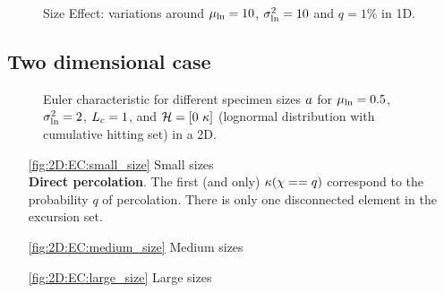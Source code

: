 \documentclass[12pt]{article}
\begin{document}
\begin{figure}[!h]
  \centering
    \hspace*{\fill}
  \hfill
   \hfill
  \hspace*{\fill}
  \caption{Size Effect: variations around $\mu_{\ln}=10$, $\sigma_{\ln}^2=10$ and $q=1\%$ in 1D.}
\end{figure}

\subsection{Two dimensional case}
\begin{figure}[!h]
  \centering
  \hspace*{\fill}
  \subfigure[$\Msize=0.001$\label{fig:2D:EC:small_size}]{\scalebox{0.5}{}}\hfill
  \subfigure[$\Msize=2.5$\label{fig:2D:EC:medium_size}]  {\scalebox{0.5}{}}\hfill
  \subfigure[$\Msize=8$\label{fig:2D:EC:large_size}]    {\scalebox{0.5}{}}  \hspace*{\fill}
  \caption{Euler characteristic for different specimen sizes $a$ for $\mu_{\ln}=0.5$, $\sigma_{\ln}^2=2$, $L_c=1$, and $\mathcal{H}=[0\ \kappa]$ (lognormal distribution with cumulative hitting set) in a 2D.\label{fig:2D:EC}}
\end{figure}

\begin{itemize}
  \item [\ref{fig:2D:EC:small_size}] Small sizes \\ \textbf{Direct percolation}. The first (and only) $\kappa(\chi==q)$ correspond to the probability $q$ of percolation. There is only one disconnected element in the excursion set.
  \item [\ref{fig:2D:EC:medium_size}] Medium sizes \\ 
  \item [\ref{fig:2D:EC:large_size}] Large sizes \\ 
\end{itemize}
\end{document}
